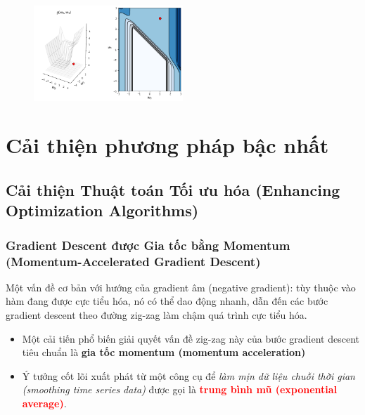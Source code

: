 \documentclass{book}
\begin{document}
\begin{figure}[H]
    \centering
    \includegraphics[width=0.5\textwidth]{images/slow_crawling_behaviour_large_flat_region.png}
\end{figure}
\chapter{Cải thiện phương pháp bậc nhất}
\section{Cải thiện Thuật toán Tối ưu hóa (Enhancing Optimization Algorithms)}
\subsection{Gradient Descent được Gia tốc bằng Momentum (Momentum-Accelerated Gradient Descent)}
Một vấn đề cơ bản với hướng của gradient âm (negative gradient): tùy thuộc vào hàm đang được cực tiểu hóa, nó có thể dao động nhanh, dẫn đến các bước gradient descent theo đường zig-zag làm chậm quá trình cực tiểu hóa.
\begin{itemize}
    \item Một cải tiến phổ biến giải quyết vấn đề zig-zag này của bước gradient descent tiêu chuẩn là \textbf{\color{red}gia tốc momentum (momentum acceleration)}
    \item Ý tưởng cốt lõi xuất phát từ một công cụ để \textit{làm mịn dữ liệu chuỗi thời gian (smoothing time series data)} được gọi là \textbf{\textcolor{red}{trung bình mũ (exponential average)}}.
\end{itemize}
\end{document}

